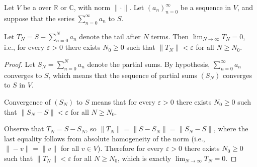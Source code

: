 \begin{lemma} \label{lemma:tail_of_convergent_series_tends_to_zero}
    Let $V$ be a  over $\mathbb{R}$ or $\mathbb{C}$, with norm $\|\cdot\|$. Let $(a_n)_{n=0}^\infty$ be a sequence in $V$, and suppose that the series $\sum_{n=0}^\infty a_n$  to $S$.

    Let $T_N = S - \sum_{n=0}^N a_n$ denote the tail after $N$ terms. Then $\lim_{N \to \infty} T_N = 0$, i.e., for every $\varepsilon > 0$ there exists $N_0 \geq 0$ such that $\|T_N\| < \varepsilon$ for all $N \geq N_0$.
\end{lemma}

\begin{proof}
    Let $S_N = \sum_{n=0}^N a_n$ denote the partial sums. By hypothesis, $\sum_{n=0}^\infty a_n$ converges to $S$, which means that the sequence of partial sums $(S_N)$ converges to $S$ in $V$.

    Convergence of $(S_N)$ to $S$ means that for every $\varepsilon > 0$ there exists $N_0 \geq 0$ such that $\|S_N - S\| < \varepsilon$ for all $N \geq N_0$.

    Observe that $T_N = S - S_N$, so $\|T_N\| = \|S - S_N\| = \|S_N - S\|$, where the last equality follows from absolute homogeneity of the norm (i.e., $\|-v\| = \|v\|$ for all $v \in V$). Therefore for every $\varepsilon > 0$ there exists $N_0 \geq 0$ such that $\|T_N\| < \varepsilon$ for all $N \geq N_0$, which is exactly $\lim_{N \to \infty} T_N = 0$.
\end{proof}
